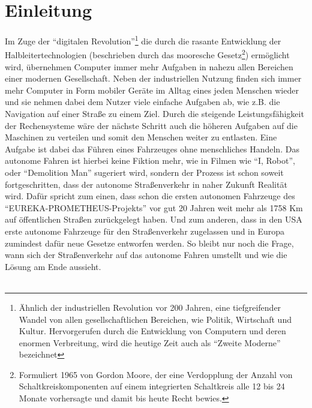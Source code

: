 \section{Einleitung}
Im Zuge der "`digitalen Revolution"'\footnote{Ähnlich der industriellen Revolution vor 200 Jahren, eine tiefgreifender Wandel von allen gesellschaftlichen Bereichen, wie Politik, Wirtschaft und Kultur. Hervorgerufen durch die Entwicklung von Computern und deren enormen Verbreitung, wird die heutige Zeit auch als "`Zweite Moderne"' bezeichnet} die durch die rasante Entwicklung der Halbleitertechnologien (beschrieben durch das mooresche Gesetz\footnote{Formuliert 1965 von Gordon Moore, der eine Verdopplung der Anzahl von Schaltkreiskomponenten auf einem integrierten Schaltkreis alle 12 bis 24 Monate vorhersagte und damit bis heute Recht bewies.}) ermöglicht wird, übernehmen Computer immer mehr Aufgaben in nahezu allen Bereichen einer modernen Gesellschaft. Neben der industriellen Nutzung finden sich immer mehr Computer in Form mobiler Geräte im Alltag eines jeden Menschen wieder und sie nehmen dabei dem Nutzer viele einfache Aufgaben ab, wie z.B. die Navigation auf einer Straße zu einem Ziel. Durch die steigende Leistungsfähigkeit der Rechensysteme wäre der nächste Schritt auch die höheren Aufgaben auf die Maschinen zu verteilen und somit den Menschen weiter zu entlasten. Eine Aufgabe ist dabei das Führen eines Fahrzeuges ohne menschliches Handeln. Das autonome Fahren ist hierbei keine Fiktion mehr, wie in Filmen wie "`I, Robot"'\cite{iRob}, oder "`Demolition Man"'\cite{DemMan} sugeriert wird, sondern der Prozess ist schon soweit fortgeschritten, dass der autonome Straßenverkehr in naher Zukunft Realität wird. Dafür spricht zum einen, dass schon die ersten autonomen Fahrzeuge des "`EUREKA-PROMETHEUS-Projekts"' \cite{Prom} vor gut 20 Jahren weit mehr als 1758 Km auf öffentlichen Straßen zurückgelegt haben. Und zum anderen, dass in den USA erste autonome Fahrzeuge für den Straßenverkehr zugelassen\cite{Neva} und in Europa zumindest dafür neue Gesetze entworfen werden\cite{Dobri}. So bleibt nur noch die Frage, wann sich der Straßenverkehr auf das autonome Fahren umstellt und wie die Lösung am Ende aussieht.\\ \\
